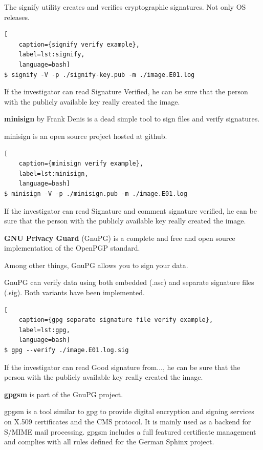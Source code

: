 The signify utility creates and verifies cryptographic signatures. Not only OS releases.

\begin{lstlisting}[
    caption={signify verify example},
    label=lst:signify,
    language=bash]
$ signify -V -p ./signify-key.pub -m ./image.E01.log
\end{lstlisting}

If the investigator can read \glqq{}Signature Verified\grqq{}, he can be sure that the person with the publicly available key really created the image.

\textbf{minisign} by Frank Denis is a dead simple tool to sign files and verify signatures.

minisign is an open source project hosted at github.

\begin{lstlisting}[
    caption={minisign verify example},
    label=lst:minisign,
    language=bash]
$ minisign -V -p ./minisign.pub -m ./image.E01.log
\end{lstlisting}

If the investigator can read \glqq{}Signature and comment signature verified\grqq{}, he can be sure that the person with the publicly available key really created the image.

\textbf{GNU Privacy Guard} (GnuPG) is a complete and free and open source implementation of the OpenPGP standard.

Among other things, GnuPG allows you to sign your data.

GnuPG can verify data using both embedded (.asc) and separate signature files (.sig). Both variants have been implemented.

\begin{lstlisting}[
    caption={gpg separate signature file verify example},
    label=lst:gpg,
    language=bash]
$ gpg --verify ./image.E01.log.sig
\end{lstlisting}

If the investigator can read \glqq{}Good signature from...\grqq{}, he can be sure that the person with the publicly available key really created the image.

\textbf{gpgsm} is part of the GnuPG project.

gpgsm is a tool similar to gpg to provide digital encryption and signing services on X.509 certificates and the CMS protocol. It is mainly used as a backend for S/MIME mail processing. gpgsm includes a full featured certificate management and complies with all rules defined for the German Sphinx project.

